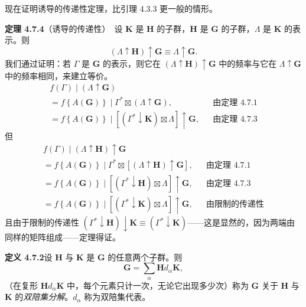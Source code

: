 现在证明诱导的传递性定理，比引理 4.3.3 更一般的情形。

\noindent\textbf{定理 4.7.4}\quad （诱导的传递性）\ 设 $\mathbf{K}$ 是 $\mathbf{H}$ 的子群，$\mathbf{H}$ 是 $\mathbf{G}$ 的子群，$\Lambda$ 是 $\mathbf{K}$ 的表示。则
\begin{equation*}
(\Lambda \uparrow \mathbf{H}) \uparrow \mathbf{G} \equiv \Lambda \uparrow \mathbf{G}.
\tag{4.7.18}
\end{equation*}
我们通过证明：若 $\Gamma$ 是 $\mathbf{G}$ 的表示，则它在 $(\Lambda \uparrow \mathbf{H}) \uparrow \mathbf{G}$ 中的频率与它在 $\Lambda \uparrow \mathbf{G}$ 中的频率相同，来建立等价。
\begin{equation*}
\begin{array}{lll}
f(\Gamma) \mid (\Lambda \uparrow \mathbf{G}) & &\\
= f\left\{A(\mathbf{G})\right\} \mid \Gamma^{*} \boxtimes (\Lambda \uparrow \mathbf{G}), & & \text{由定理 4.7.1}\\
= f\left\{A(\mathbf{G})\right\} \mid \left[(\Gamma^{*} \downarrow \mathbf{K}) \boxtimes \Lambda\right] \uparrow \mathbf{G}, & & \text{由定理 4.7.3}
\end{array}
\end{equation*}
但
\begin{equation*}
\begin{array}{lll}
f(\Gamma) \mid (\Lambda \uparrow \mathbf{H}) \uparrow \mathbf{G} & &\\
= f\left\{A(\mathbf{G})\right\} \mid \Gamma^{*} \boxtimes \left[(\Lambda \uparrow \mathbf{H}) \uparrow \mathbf{G}\right], & & \text{由定理 4.7.1}\\
= f\left\{A(\mathbf{G})\right\} \mid \left[(\Gamma^{*} \downarrow \mathbf{H}) \boxtimes \Lambda\right] \uparrow \mathbf{G}, & & \text{由定理 4.7.3}\\
= f\left\{A(\mathbf{G})\right\} \mid \left[(\Gamma^{*} \downarrow \mathbf{K}) \boxtimes \Lambda\right] \uparrow \mathbf{G}, & & \text{由限制的传递性}
\end{array}
\end{equation*}
且由于限制的传递性 $(\Gamma^{*} \downarrow \mathbf{H}) \downarrow \mathbf{K} \equiv (\Gamma^{*} \downarrow \mathbf{K})$——这是显然的，因为两端由同样的矩阵组成——定理得证。

\noindent\textbf{定义 4.7.2}\quad 设 $\mathbf{H}$ 与 $\mathbf{K}$ 是 $\mathbf{G}$ 的任意两个子群。则
\begin{equation*}
\mathbf{G} = \sum_{\alpha}\mathbf{H}d_{\alpha}\mathbf{K},
\tag{4.7.19}
\end{equation*}
（在复形 $\mathbf{H}d_{\alpha}\mathbf{K}$ 中，每个元素只计一次，无论它出现多少次）称为 $\mathbf{G}$ 关于 $\mathbf{H}$ 与 $\mathbf{K}$ 的\textit{双陪集分解}。$d_{\alpha}$ 称为双陪集代表。

